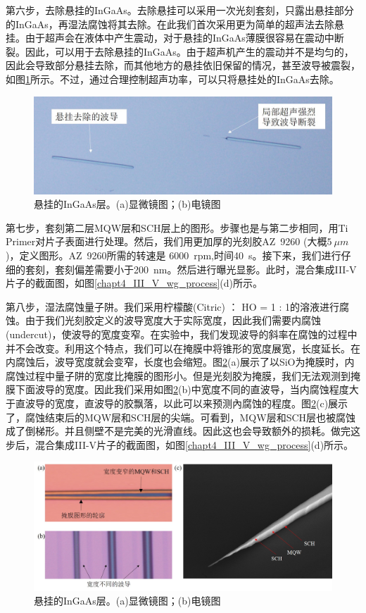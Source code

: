 第六步，去除悬挂的InGaAs。去除悬挂可以采用一次光刻套刻，只露出悬挂部分的InGaAs，再湿法腐蚀将其去除。在此我们首次采用更为简单的超声法去除悬挂。由于超声会在液体中产生震动，对于悬挂的InGaAs薄膜很容易在震动中断裂。因此，可以用于去除悬挂的InGaAs。由于超声机产生的震动并不是均匀的，因此会导致部分悬挂去除，而其他地方的悬挂依旧保留的情况，甚至波导被震裂，如图\ref{chapt4_III_V_remove_InGaAs}所示。不过，通过合理控制超声功率，可以只将悬挂处的InGaAs去除。
\begin{figure}[!h]
	\centering
	\includegraphics[width=14cm]{./Pictures/chapt4_III_V_remove_InGaAs.jpg}
	\caption{悬挂的InGaAs层。(a)显微镜图；(b)电镜图}
	\label{chapt4_III_V_remove_InGaAs}
\end{figure}

第七步，套刻第二层MQW层和SCH层上的图形。步骤也是与第二步相同，用Ti Primer对片子表面进行处理。然后，我们用更加厚的光刻胶AZ~9260 (大概$5~\mu m$)，定义图形。AZ~9260所需的转速是 6000~rpm,时间40~s。接下来，我们进行仔细的套刻，套刻偏差需要小于200~nm。然后进行曝光显影。此时，混合集成III-V片子的截面图，如图\ref{chapt4_III_V_wg_process}(d)所示。

第八步，湿法腐蚀量子阱。我们采用柠檬酸(Citric) ： HO = 1 : 1的溶液进行腐蚀。由于我们光刻胶定义的波导宽度大于实际宽度，因此我们需要内腐蚀(undercut)，使波导的宽度变窄。在实验中，我们发现波导的斜率在腐蚀的过程中并不会改变。利用这个特点，我们可以在掩膜中将锥形的宽度展宽，长度延长。在内腐蚀后，波导宽度就会变窄，长度也会缩短。图\ref{chapt4_III_V_undercut_MQW}(a)展示了以SiO为掩膜时，内腐蚀过程中量子阱的宽度比掩膜的图形小。但是光刻胶为掩膜，我们无法观测到掩膜下面波导的宽度。因此我们采用如图\ref{chapt4_III_V_undercut_MQW}(b)中宽度不同的直波导，当内腐蚀程度大于直波导的宽度，直波导的胶飘落，以此可以来预测內腐蚀的程度。图\ref{chapt4_III_V_undercut_MQW}(c)展示了，腐蚀结束后的MQW层和SCH层的尖端。可看到，MQW层和SCH层也被腐蚀成了倒梯形。并且侧壁不是完美的光滑直线。因此这也会导致额外的损耗。做完这步后，混合集成III-V片子的截面图，如图\ref{chapt4_III_V_wg_process}(d)所示。
\begin{figure}[!h]
	\centering
	\includegraphics[width=14cm]{./Pictures/chapt4_III_V_undercut_MQW.jpg}
	\caption{悬挂的InGaAs层。(a)显微镜图；(b)电镜图}
	\label{chapt4_III_V_undercut_MQW}
\end{figure}

